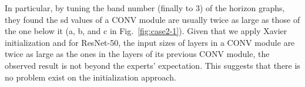 \documentclass[format=acmsmall, review=false, screen=true]{acmart}
\makeatletter
\newcommand{\dy}{\textcolor[rgb]{0,0,0}}
\newcommand\footnoteref[1]{\protected@xdef\@thefnmark{\ref{#1}}\@footnotemark}
\makeatother
\begin{document}
\dy{In particular, by tuning the band number (finally to 3) of the horizon graphs, they found the sd values of a CONV module are usually twice as large as those of the one below it (a, b, and c in Fig.~\ref{fig:case2-1}).
Given that we apply Xavier initialization\footnoteref{note7} and for ResNet-50, the input sizes of layers in a CONV module are twice as large as the ones in the layers of its previous CONV module, the observed result is not beyond the experts' expectation. This suggests that there is no problem exist on the initialization approach.
}%
\end{document}
